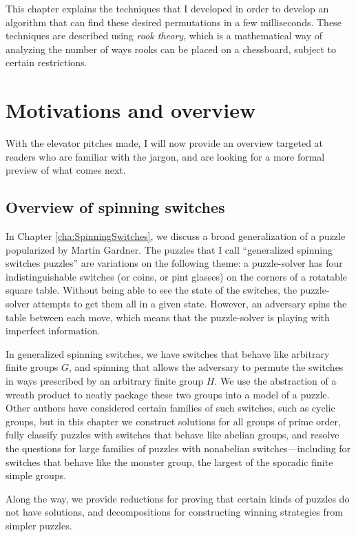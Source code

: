 This chapter explains the techniques that I developed in order to develop
an algorithm that can find these desired permutations in a few milliseconds.
These techniques are
described using \textit{rook theory}, which is a mathematical way of analyzing
the number of ways rooks can be placed on a chessboard, subject to certain
restrictions.

\section{Motivations and overview}
With the elevator pitches made, I will now provide an overview targeted at
readers who are familiar with the jargon, and are looking for a more formal
preview of what comes next.

\subsection{Overview of spinning switches}
In Chapter \ref{cha:SpinningSwitches}, we discuss a broad generalization of a
puzzle popularized by Martin Gardner. The puzzles that I call
``generalized spinning switches puzzles'' are variations on the following theme:
a puzzle-solver has four indistinguishable switches (or coins, or pint glasses)
on the corners of a rotatable square table. Without being able to see the state
of the switches, the puzzle-solver attempts to get them all in a given state.
However, an adversary spins the table between each move, which means that the
puzzle-solver is playing with imperfect information.

In generalized spinning switches, we have switches that behave like arbitrary
finite groups $G$, and spinning that allows the adversary to permute the switches in
ways prescribed by an arbitrary finite group $H$. We use the abstraction of a wreath
product to neatly package these two groups into a model of a puzzle.
Other authors have considered certain families of such switches, such as cyclic
groups, but in this chapter we construct solutions for all groups of prime order,
fully classify puzzles with switches that behave like abelian groups,
and resolve the questions for large families of puzzles with nonabelian
switches---including for switches that behave like the monster group, the
largest of the sporadic finite simple groups.

Along the way, we provide reductions for proving that certain kinds of puzzles
do not have solutions, and decompositions for constructing winning strategies
from simpler puzzles.


